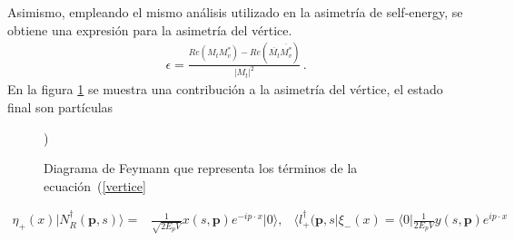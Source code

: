  Asimismo, empleando el mismo análisis utilizado en la asimetría de self-energy, se obtiene una expresión para la asimetría del vértice.
\begin{align}
\epsilon=\frac{Re( M_{t}M_{v}^*)-Re(\overline{M_{t}}\overline{M_{v}^*})}{|M_{t}|^2}\, . 
\end{align}
En la figura \ref{v} se muestra una contribución a la asimetría del vértice, el estado final son partículas
\begin{figure}[H]
  \centering
  \caption{Diagrama de Feymann que representa los términos de la ecuación~(\ref{vertice}})
  \label{v}
\end{figure}

\begin{align}
\label{vertice}
\eta_+(x)|N_R ^\dagger(\boldsymbol{p},s)\rangle=&\frac{1}{\sqrt{2 E_{p} V}}x(s,\mathbf{p})e^{-i p\cdot x}|0\rangle,&\langle l_+^\dagger(\boldsymbol{p},s|\xi_-(x)=\langle 0|\frac{1}{2E_p V}y(s,\mathbf{p})e^{i p\cdot x}
\end{align}


